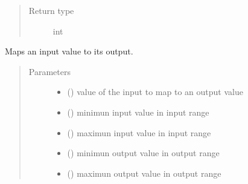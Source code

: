 \documentclass[letterpaper,10pt,english]{sphinxmanual}
\begin{document}
\begin{fulllineitems}
\begin{fulllineitems}
\begin{quote}
\begin{description}
\item[{Return type}] \leavevmode
\sphinxAtStartPar
int

\end{description}\end{quote}

\end{fulllineitems}


\begin{fulllineitems}
\label{\detokenize{base:OutputObject.OutputObject.map_values}}
\sphinxAtStartPar
Maps an input value to its output.
\begin{quote}\begin{description}
\item[{Parameters}] \leavevmode\begin{itemize}
\item {} 
\sphinxAtStartPar
{} () \textendash{} value of the input to map to an output value

\item {} 
\sphinxAtStartPar
{} () \textendash{} minimun input value in input range

\item {} 
\sphinxAtStartPar
{} () \textendash{} maximun input value in input range

\item {} 
\sphinxAtStartPar
{} () \textendash{} minimun output value in output range

\item {} 
\sphinxAtStartPar
{} () \textendash{} maximun output value in output range

\end{itemize}


\end{description}
\end{quote}
\end{fulllineitems}
\end{fulllineitems}
\end{document}
